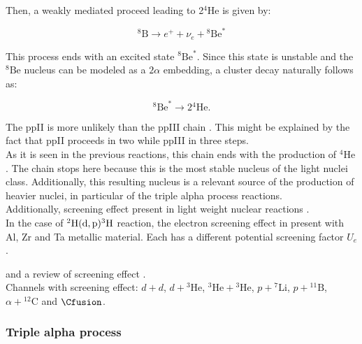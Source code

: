 \documentclass[openany]{book}
\begin{document}
Then, a weakly mediated proceed leading to 2$\mathrm{{}^4He}$ is given by: 

\begin{equation} \label{eq:reaction_8Bpositron}
	{}^{8}\mathrm{B} \rightarrow e^{+} + \nu_e + 	{}^{8}\mathrm{{Be}^{*}}
\end{equation}

This process ends with an excited state ${}^{8}\mathrm{{Be}^{*}}$. Since this state is unstable and the $\mathrm{{}^{8}Be}$ nucleus can be modeled as a $2\alpha$ embedding, a cluster decay naturally follows as: 

\begin{equation} \label{eq:reaction_8Bdisintegration}
	{}^{8}\mathrm{{Be}^{*}} \rightarrow 2{}^{4}\mathrm{He}.
\end{equation}

The ppII is more unlikely than the ppIII chain \cite{bertulani_2003}. This might be explained by the fact that ppII proceeds in two  while ppIII in three steps. \\

As it is seen in the previous reactions, this chain ends with the production of $\mathrm{{}^{4}He}$. The chain stops here because this is the most stable nucleus of the light nuclei class. Additionally, this resulting nucleus is a relevant source of the production of heavier nuclei, in particular of the triple alpha process reactions. \\

Additionally, screening effect present in light weight nuclear reactions \cite{raiola_migliardi_gyurky_aliotta_formicola_bonetti_broggini_campajola_corvisiero_costantini_et_2002} . \\

In the case of $\mathrm{{}^{2}H(d, p){}^{3}H}$ reaction, the electron screening effect in present with Al, Zr and Ta metallic material. Each has a different potential screening factor $U_e$. 

and a review of screening effect \cite{assenbaum_langanke_rolfs_1987}. \\

Channels with screening effect: $d+d$, $d+\mathrm{{}^{3}He}$, $\mathrm{{}^{3}He}+\mathrm{{}^{3}He}$, $p+\mathrm{{}^{7}Li}$, $p+\mathrm{{}^{11}B}$, $\alpha+\mathrm{{}^{12}C}$ and $\Cfusion$. 


\subsubsection{Triple alpha process}
\end{document}
